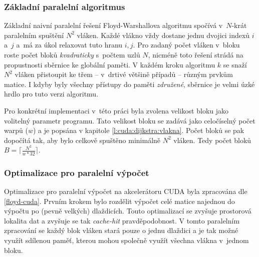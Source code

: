 \subsubsection{Základní paralelní algoritmus}
Základní naivní paralelní řešení Floyd-Warshallova algoritmu spočívá v~$N$-krát paralelním spuštění $N^2$ vláken. 
Každé vlákno vždy dostane jednu dvojici indexů $i$ a~$j$ a~má za úkol relaxovat tuto hranu $i,j$. Pro zadaný počet vláken
v~bloku roste počet bloků \emph{kvadraticky} s~počtem uzlů $N$, nicméně toto řešení strádá na propustnosti sběrnice
ke globální paměti. V každém kroku algoritmu $k$ se snaží $N^2$ vláken přistoupit ke třem -- v~drtivé většině případů -- 
různým prvkům matice. I kdyby byly všechny přístupy do paměti \emph{združené}, sběrnice je velmi úzké hrdlo pro tuto verzi
algoritmu.


Pro konkrétní implementaci v~této práci byla zvolena velikost bloku jako volitelný parametr programu. Tato velikost bloku se zadává
jako celočíselný počet warpů ($w$) a je popsána v kapitole \ref{l:cuda:dijkstra:vlakna}.
Počet bloků se pak dopočítá tak, aby bylo celkově spuštěno minimálně $N^2$ vláken. Tedy počet bloků $B = \lceil \frac{N^2}{w*32} \rceil$.

\subsubsection{Optimalizace pro paralelní výpočet}
Optimalizace pro paralelní výpočet na akcelerátoru CUDA byla zpracována dle \ref{floyd-cuda}. Prvním krokem bylo rozdělit výpočet  celé matice najednou do výpočtu po (pevně velkých) dlaždicích. Touto optimalizací se zvyšuje prostorová lokalita dat a zvyšuje se tak \emph{cache-hit} pravděpodobnost. V tomto paralelním zpracování se každý blok vláken stará pouze o jednu dlaždici a je tak možné využít sdílenou paměť, kterou mohou společně využít všechna vlákna v~jednom bloku.

